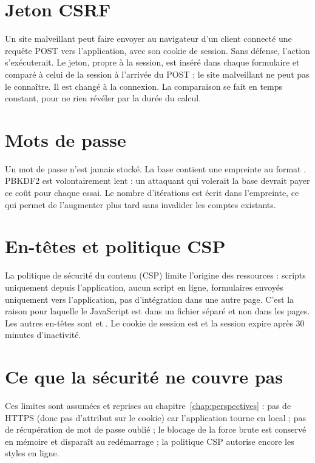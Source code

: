 \section{Jeton CSRF}
Un site malveillant peut faire envoyer au navigateur d'un client connecté une requête POST vers l'application, avec son
cookie de session. Sans défense, l'action s'exécuterait. Le jeton, propre à la session, est inséré dans chaque
formulaire et comparé à celui de la session à l'arrivée du POST ; le site malveillant ne peut pas le connaître. Il est changé à la connexion.
La comparaison se fait en temps constant, pour ne rien révéler par la durée du calcul.

\section{Mots de passe}
Un mot de passe n'est jamais stocké. La base contient une empreinte au format
. PBKDF2 \cite{rfc8018} est volontairement lent : un attaquant qui
volerait la base devrait payer ce coût pour chaque essai. Le nombre d'itérations est écrit dans l'empreinte, ce qui permet de
l'augmenter plus tard sans invalider les comptes existants.

\section{En-têtes et politique CSP}
La politique de sécurité du contenu (CSP) limite l'origine des ressources : scripts uniquement depuis l'application,
aucun script en ligne, formulaires envoyés uniquement vers l'application, pas d'intégration dans une autre page. C'est
la raison pour laquelle le JavaScript est dans un fichier séparé et non dans les pages. Les autres en-têtes sont
 et . Le cookie de session est  et
la session expire après 30 minutes d'inactivité.

\section{Ce que la sécurité ne couvre pas}
Ces limites sont assumées et reprises au chapitre~\ref{chap:perspectives} : pas de HTTPS (donc pas d'attribut  sur le
cookie) car l'application tourne en local ; pas de récupération de mot de passe oublié ; le blocage de la force brute est
conservé en mémoire et disparaît au redémarrage ; la politique CSP autorise encore les styles en ligne.
